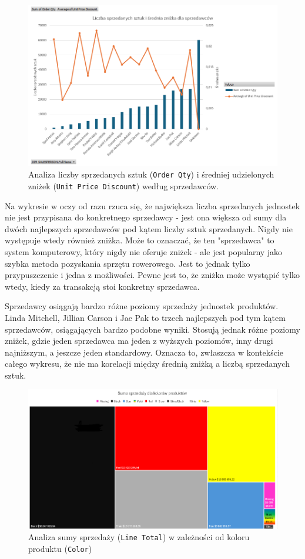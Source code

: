 \documentclass[a4paper,12pt]{article}
\begin{document}
\begin{figure}[H]
    \centering
    \includegraphics[width=1.0\textwidth]{images/7_2.png}
    \caption{Analiza liczby sprzedanych sztuk (\texttt{Order Qty}) i średniej udzielonych zniżek (\texttt{Unit Price Discount}) według sprzedawców.}
\end{figure}

Na wykresie w oczy od razu rzuca się, że największa liczba sprzedanych jednostek nie jest przypisana do konkretnego sprzedawcy - jest ona większa od sumy dla dwóch najlepszych sprzedawców pod kątem liczby sztuk sprzedanych. Nigdy nie występuje wtedy również zniżka.
Może to oznaczać, że ten "sprzedawca" to system komputerowy, który nigdy nie oferuje zniżek - ale jest popularny jako szybka metoda pozyskania sprzętu rowerowego. Jest to jednak tylko przypuszczenie i jedna z możliwości. Pewne jest to, że zniżka może wystąpić tylko wtedy, kiedy za transakcją stoi konkretny sprzedawca.

Sprzedawcy osiągają bardzo różne poziomy sprzedaży jednostek produktów. Linda Mitchell, Jillian Carson i Jae Pak to trzech najlepszych pod tym kątem sprzedawców, osiągających bardzo podobne wyniki. Stosują jednak różne poziomy zniżek, gdzie jeden sprzedawca ma jeden z wyższych poziomów, inny drugi najniższym, a jeszcze jeden standardowy. Oznacza to, zwłaszcza w kontekście całego wykresu, że nie ma korelacji między średnią zniżką a liczbą sprzedanych sztuk.

\begin{figure}[H]
    \centering
    \includegraphics[width=1.0\textwidth]{images/7_3.png}
    \caption{Analiza sumy sprzedaży (\texttt{Line Total}) w zależności od koloru produktu (\texttt{Color})}
\end{figure}
\end{document}
